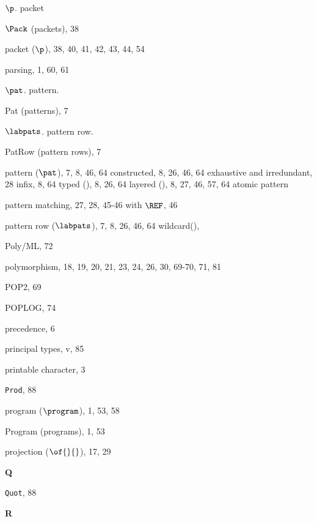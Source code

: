 \begin{theindex}
\item $\p$. \see packet
\item $\Pack$ (packets), 38
\item packet ($\p$), 38, 40, 41, 42, 43, 44, 54
\item parsing, 1, 60, 61
\item $\pat$. \see pattern.
\item Pat (patterns), 7
\item $\labpats$. \see pattern row.
\item PatRow (pattern rows), 7
\item pattern ($\pat$), 7, 8, 46, 64
\subitem constructed, 8, 26, 46, 64
\subitem exhaustive and irredundant, 28
\subitem infix, 8, 64
\subitem typed (\boxml{:}), 8, 26, 64
\subitem layered (), 8, 27, 46, 57, 64
\subitem \seealso atomic pattern
\item pattern matching, 27, 28, 45-46
\subitem with $\REF$, 46
\item pattern row ($\labpats$), 7, 8, 26, 46, 64
\subitem wildcard(), \dotdotdotrefs
\item Poly/ML, 72
\item polymorphism, 18, 19, 20, 21, 23, 24, 26, 30, 69-70, 71, 81
\item POP2, 69
\item POPLOG, 74
\item precedence, 6
\item principal types, v, 85
\item printable character, 3
\item {\tt Prod}, 88
\item program ($\program$), 1, 53, 58
\item Program (programs), 1, 53
\item projection ($\of{}{}$), 17, 29
\indexspace

\parbox{64mm}{\hfil{\large\bf Q}\hfil}

\indexspace

\item {\tt Quot}, 88
\indexspace

\parbox{64mm}{\hfil{\large\bf R}\hfil}

\indexspace


\end{theindex}
